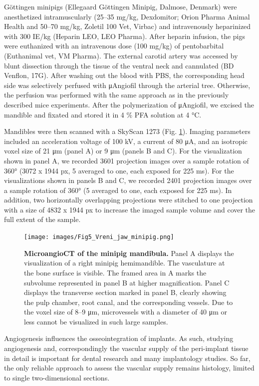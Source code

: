 Göttingen minipigs (Ellegaard Göttingen Minipig, Dalmose, Denmark) were anesthetized intramuscularly (25--35 mg/kg, Dexdomitor; Orion Pharma Animal Health and 50--70 mg/kg, Zoletil 100 Vet, Virbac) and intravenously heparinized with 300 IE/kg (Heparin LEO, LEO Pharma).
After heparin infusion, the pigs were euthanized with an intravenous dose (100 mg/kg) of pentobarbital (Euthanimal vet, VM Pharma).
The external carotid artery was accessed by blunt dissection through the tissue of the ventral neck and cannulated (BD Venflon, 17G).
After washing out the blood with PBS, the corresponding head side was selectively perfused with μAngiofil through the arterial tree.
Otherwise, the perfusion was performed with the same approach as in the previously described mice experiments.
After the polymerization of μAngiofil, we excised the mandible and fixated and stored it in 4 \% PFA solution at 4 °C.

Mandibles were then scanned with a SkyScan 1273 (Fig. \ref{fig:5}).
Imaging parameters included an acceleration voltage of 100 kV, a current of 80 μA, and an isotropic voxel size of 21 μm (panel A) or 9 μm (panels B and C).
For the visualization shown in panel A, we recorded 3601 projection images over a sample rotation of 360° (3072 x 1944 px, 5 averaged to one, each exposed for 225 ms).
For the visualizations shown in panels B and C, we recorded 2401 projection images over a sample rotation of 360° (5 averaged to one, each exposed for 225 ms).
In addition, two horizontally overlapping projections were stitched to one projection with a size of 4832 x 1944 px to increase the imaged sample volume and cover the full extent of the sample.

\begin{figure}
\hypertarget{fig:5}{%
\centering
\texttt{[image: images/Fig5\_Vreni\_jaw\_minipig.png]}
\caption{\textbf{MicroangioCT of the minipig mandibula.}
Panel A displays the visualization of a right minipig hemimandible.
The vasculature at the bone surface is visible.
The framed area in A marks the subvolume represented in panel B at higher magnification.
Panel C displays the transverse section marked in panel B, clearly showing the pulp chamber, root canal, and the corresponding vessels.
Due to the voxel size of 8--9 μm, microvessels with a diameter of 40 μm or less cannot be visualized in such large samples.}\label{fig:5}
}
\end{figure}

Angiogenesis influences the osseointegration of implants.
As such, studying angiogenesis and, correspondingly the vascular supply of the peri-implant tissue in detail is important for dental research and many implantology studies.
So far, the only reliable approach to assess the vascular supply remains histology, limited to single two-dimensional sections.

